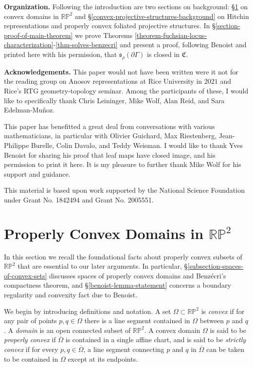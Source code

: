 \documentclass[12pt,a4paper]{amsart}
\theoremstyle{definition}
\theoremstyle{plain}
\numberwithin{equation}{section}
\begin{document}
\par \noindent \textbf{Organization.} Following the introduction are two sections on background: \S \ref{background-section-convex-domains} on convex domains in $\mathbb{RP}^2$ and \S \ref{convex-projective-structures-background} on Hitchin representations and properly convex foliated projective structures. In \S \ref{section-proof-of-main-theorem} we prove Theorems \ref{theorem-fuchsian-locus-characterization}-\ref{thm-solves-benzecri} and present a proof, following Benoist and printed here with his permission, that $\mathfrak{s}_\rho(\partial \Gamma)$ is closed in $\mathfrak{C}$.

\vspace{0.25cm}

\par \noindent \textbf{Acknowledgements.} This paper would not have been written were it not for the reading group on Anosov representations at Rice University in $2021$ and Rice's RTG geometry-topology seminar. Among the participants of these, I would like to specifically thank Chris Leininger, Mike Wolf, Alan Reid, and Sara Edelman-Mu\~noz.

This paper has benefitted a great deal from conversations with various mathematicians, in particular with Olivier Guichard, Max Riestenberg, Jean-Philippe Burelle, Colin Davalo, and Teddy Weisman. I would like to thank Yves Benoist for sharing his proof that leaf maps have closed image, and his permission to print it here. It is my pleasure to further thank Mike Wolf for his support and guidance.

This material is based upon work supported by the National Science Foundation under Grant No. 1842494 and Grant No. 2005551.

\section{Properly Convex Domains in $\mathbb{RP}^2$}\label{background-section-convex-domains}

In this section we recall the foundational facts about properly convex subsets of $\mathbb{RP}^2$ that are essential to our later arguments. In particular, \S\ref{subsection-spaces-of-convex-sets} discusses spaces of properly convex domains and Benz\'ecri's compactness theorem, and \S\ref{benoist-lemma-statement} concerns a boundary regularity and convexity fact due to Benoist.

We begin by introducing definitions and notation. A set $\Omega \subset \mathbb{RP}^2$ is \textit{convex} if for any pair of points $p,q \in \Omega$ there is a line segment contained in $\Omega$ between $p$ and $q$. A \textit{domain} is an open connected subset of $\mathbb{RP}^2$. A convex domain $\Omega$ is said to be \textit{properly convex} if $\overline{\Omega}$ is contained in a single affine chart, and is said to be \textit{strictly convex} if for every $p,q \in \overline{\Omega}$, a line segment connecting $p$ and $q$ in $\overline{\Omega}$ can be taken to be contained in $\Omega$ except at its endpoints.
\end{document}
